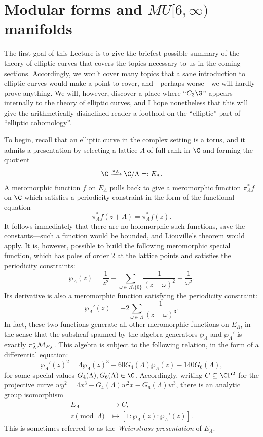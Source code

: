 









\section{Modular forms and \texorpdfstring{\(MU[6, \infty)\)}{MU[6, oo)}--manifolds}\label{SectionEllipticCurvesAndThetaFunctions}

The first goal of this Lecture is to give the briefest possible summary of the theory of elliptic curves that covers the topics necessary to us in the coming sections.  Accordingly, we won't cover many topics that a sane introduction to elliptic curves would make a point to cover, and---perhaps worse---we will hardly prove anything.  We will, however, discover a place where ``\(C_3 \G\)'' appears internally to the theory of elliptic curves, and I hope nonetheless that this will give the arithmetically disinclined reader a foothold on the ``elliptic'' part of ``elliptic cohomology''.

To begin, recall that an elliptic curve in the complex setting is a torus, and it admits a presentation by selecting a lattice \(\Lambda\) of full rank in \(\C\) and forming the quotient \[\C \xrightarrow{\pi_\Lambda} \C / \Lambda =: E_\Lambda.\]  A meromorphic function \(f\) on \(E_\Lambda\) pulls back to give a meromorphic function \(\pi_\Lambda^* f\) on \(\C\) which satisfies a periodicity constraint in the form of the functional equation \[\pi_\Lambda^* f(z + \Lambda) = \pi_\Lambda^* f(z).\]  It follows immediately that there are no holomorphic such functions, save the constants---such a function would be bounded, and Liouville's theorem would apply.  It is, however, possible to build the following meromorphic special function, which has poles of order \(2\) at the lattice points and satisfies the periodicity constraints: \[\wp_\Lambda(z) = \frac{1}{z^2} + \sum_{\omega \in \Lambda \setminus \{0\}} \frac{1}{(z - \omega)^2} - \frac{1}{\omega^2}.\]  Its derivative is also a meromorphic function satisfying the periodicity constraint: \[\wp_\Lambda'(z) = -2 \sum_{\omega \in \Lambda} \frac{1}{(z - \omega)^3}.\]  In fact, these two functions generate all other meromorphic functions on \(E_\Lambda\), in the sense that the subsheaf spanned by the algebra generators \(\wp_\Lambda\) and \(\wp_\Lambda'\) is exactly \(\pi_\Lambda^* \mathcal{M}_{E_\Lambda}\).  This algebra is subject to the following relation, in the form of a differential equation: \[\wp_\Lambda'(z)^2 = 4 \wp_\Lambda(z)^3 - 60G_4(\Lambda) \wp_\Lambda(z) - 140G_6(\Lambda),\] for some special values \(G_4(\Lambda), G_6(\Lambda) \in \C\).  Accordingly, writing \(C \subseteq \CP^2\) for the projective curve \(wy^2 = 4x^3 - G_4(\Lambda) w^2 x - G_6(\Lambda) w^3\), there is an analytic group isomorphism
\begin{align*}
E_\Lambda & \to C, \\
z \pmod \Lambda & \mapsto [1: \wp_\Lambda(z): \wp_\Lambda'(z)].
\end{align*}
This is sometimes referred to as the \textit{Weierstrass presentation} of \(E_\Lambda\).

